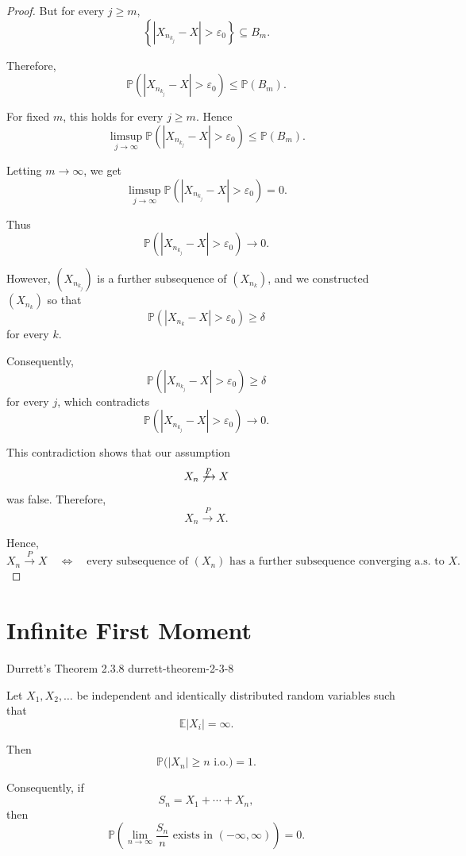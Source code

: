 \begin{proof}
But for every $j\geq m$,
\[
    \left\{
        |X_{n_{k_j}}-X|>\varepsilon_0
    \right\}
    \subseteq B_m.
\]

Therefore,
\[
    \mathbb P(|X_{n_{k_j}}-X|>\varepsilon_0)
    \leq \mathbb P(B_m).
\]

For fixed $m$, this holds for every $j\geq m$. Hence
\[
    \limsup_{j\to\infty}
    \mathbb P(|X_{n_{k_j}}-X|>\varepsilon_0)
    \leq \mathbb P(B_m).
\]

Letting $m\to\infty$, we get
\[
    \limsup_{j\to\infty}
    \mathbb P(|X_{n_{k_j}}-X|>\varepsilon_0)
    =0.
\]

Thus
\[
    \mathbb P(|X_{n_{k_j}}-X|>\varepsilon_0)
    \longrightarrow0.
\]

However, $(X_{n_{k_j}})$ is a further subsequence of $(X_{n_k})$, and
we constructed $(X_{n_k})$ so that
\[
    \mathbb P(|X_{n_k}-X|>\varepsilon_0)
    \geq\delta
\]
for every $k$.

Consequently,
\[
    \mathbb P(|X_{n_{k_j}}-X|>\varepsilon_0)
    \geq\delta
\]
for every $j$,
which contradicts
\[
    \mathbb P(|X_{n_{k_j}}-X|>\varepsilon_0)
    \longrightarrow0.
\]

This contradiction shows that our assumption
\[
    X_n\not\xrightarrow{P}X
\]
was false. Therefore,
\[
    \boxed{
    X_n\xrightarrow{P}X.
    }
\]

Hence,
\[
    \boxed{
    X_n\xrightarrow{P}X
    \quad\Longleftrightarrow\quad
    \text{every subsequence of $(X_n)$ has a further subsequence
    converging a.s. to $X$.}
    }
\]

\end{proof}


\section{Infinite First Moment}

\begin{theorem}
{Durrett's Theorem 2.3.8}
{durrett-theorem-2-3-8}

Let $X_1,X_2,\ldots$ be independent and identically distributed random
variables such that
\[
    \mathbb{E}|X_i|=\infty.
\]

Then
\[
    \mathbb{P}\bigl(|X_n|\geq n \text{ i.o.}\bigr)=1.
\]

Consequently, if
\[
    S_n=X_1+\cdots+X_n,
\]
then
\[
    \mathbb{P}\left(
        \lim_{n\to\infty}\frac{S_n}{n}
        \text{ exists in }(-\infty,\infty)
    \right)=0.
\]

\end{theorem}


